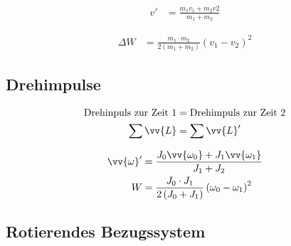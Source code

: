 \begin{boxleft}
\end{boxleft}\begin{boxrightshaded}
\begin{align}
v'		&=\frac{m_1v_1+m_2v2}{m_1+m_2}
\end{align}
\end{boxrightshaded}

\begin{boxleft}
\end{boxleft}\begin{boxrightshaded}
\begin{align}
\Delta W	&=\frac{m_1\cdot m_2}{2\left(m_1+m_2\right)}\left(v_1-v_2\right)^2
\end{align}
\end{boxrightshaded}
\subsection{Drehimpulse}

\begin{boxleft}
\end{boxleft}\begin{boxrightshaded}
\begin{align}
\text{Drehinpuls zur Zeit 1} &= \text{Drehimpuls zur Zeit 2}\\
\sum \vv{L}&=\sum \vv{L}'
\end{align}
\end{boxrightshaded}

\begin{boxleft}
\end{boxleft}\begin{boxrightshaded}
\begin{align}
\vv{\omega}'&=\frac{J_0\vv{\omega_0}+J_1\vv{\omega_1}}{J_1+J_2}\\
W&=\frac{J_0\cdot J_1}{2\left(J_0+J_1\right)}\left(\omega_0-\omega_1\right)^2
\end{align}
\end{boxrightshaded}


\subsection{Rotierendes Bezugssystem}

